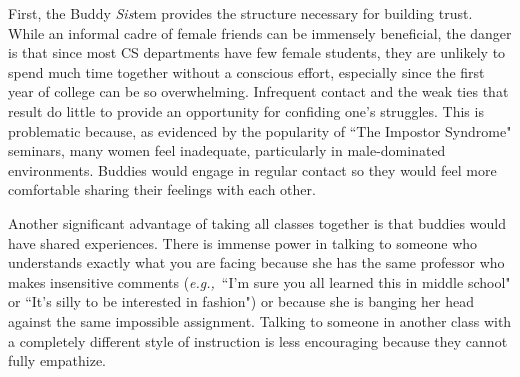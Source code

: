 \documentclass{article}
\newcommand{\eg}{{\em e.g.,}~}
\begin{document}
First, the Buddy \textit{Sis}tem provides the structure necessary for building trust.
While an informal cadre of female friends can be immensely beneficial, the danger is that since most CS departments have few female students, they are unlikely to spend much time together without a conscious effort, especially since the first year of college can be so overwhelming.
Infrequent contact and the weak ties that result do little to provide an opportunity for confiding one's struggles.
This is problematic because, as evidenced by the popularity of ``The Impostor Syndrome" seminars, many women feel inadequate, particularly in male-dominated environments.
Buddies would engage in regular contact so they would feel more comfortable sharing their feelings with each other.

Another significant advantage of taking all classes together is that buddies would have shared experiences.
There is immense power in talking to someone who understands exactly what you are facing because she has the same professor who makes insensitive comments (\eg ``I'm sure you all learned this in middle school" or ``It's silly to be interested in fashion") or because she is banging her head against the same impossible assignment.
Talking to someone in another class with a completely different style of instruction is less encouraging because they cannot fully empathize.


\end{document}
